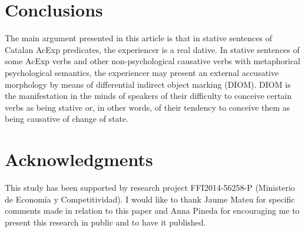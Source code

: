 \documentclass[output=paper,modfonts,nonflat,newtxmath]{langsci/langscibook}
\begin{document}

\section{Conclusions}

The main argument presented in this article is that in stative sentences of Catalan AcExp predicates, the experiencer is a real dative. In stative sentences of some AcExp verbs and other non-psychological causative verbs with metaphorical psychological semantics, the experiencer may present an external accusative morphology by means of differential indirect object marking (DIOM). DIOM is the manifestation in the minds of speakers of their difficulty to conceive certain verbs as being stative or, in other words, of their tendency to conceive them as being causative of change of state.

\section*{Acknowledgments} This study has been supported by research project FFI2014-56258-P ({Ministerio} {de} {Economía} {y} {Competitividad}). I would like to thank Jaume Mateu for specific comments made in relation to this paper and Anna Pineda for encouraging me to present this research in public and to have it published.
\end{document}
